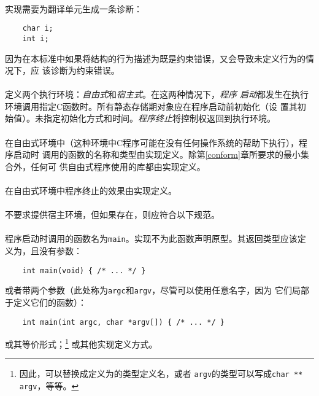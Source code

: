 \paragraph{}
\ex* 实现需要为翻译单元生成一条诊断：
\begin{lstlisting}
    char i;
    int i;
\end{lstlisting}
因为在本标准中如果将结构的行为描述为既是约束错误，又会导致未定义行为的情况下，应
该诊断为约束错误。

\paragraph{}
定义两个执行环境：\textit{自由式}和\textit{宿主式}。在这两种情况下，\textit{程序
启动}都发生在执行环境调用指定C函数时。所有静态存储期对象应在程序启动前初始化（设
置其初始值）。未指定初始化方式和时间。\textit{程序终止}将控制权返回到执行环境。


\paragraph{}
在自由式环境中（这种环境中C程序可能在没有任何操作系统的帮助下执行），程序启动时
调用的函数的名称和类型由实现定义。除第\ref{conform}章所要求的最小集合外，任何可
供自由式程序使用的库都由实现定义。

\paragraph{}
在自由式环境中程序终止的效果由实现定义。

\paragraph{}
不要求提供宿主环境，但如果存在，则应符合以下规范。

\paragraph{}
程序启动时调用的函数名为\texttt{main}。实现不为此函数声明原型。其返回类型应该定
义为，且没有参数：
\begin{lstlisting}
    int main(void) { /* ... */ }
\end{lstlisting}
或者带两个参数（此处称为\texttt{argc}和\texttt{argv}，尽管可以使用任意名字，因为
它们局部于定义它们的函数）：
\begin{lstlisting}
    int main(int argc, char *argv[]) { /* ... */ }
\end{lstlisting}
或其等价形式；\footnote{因此，可以替换成定义为的类型定义名，或者
\texttt{argv}的类型可以写成\texttt{char ** argv}，等等。} 或其他实现定义方式。


